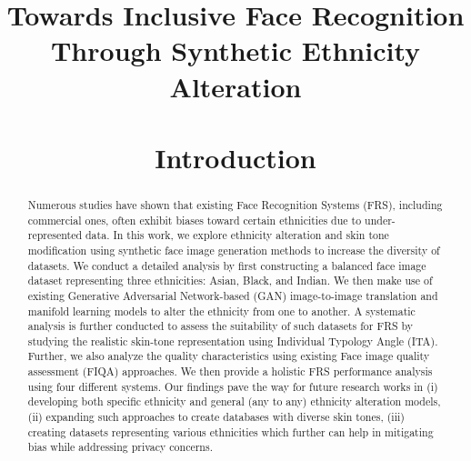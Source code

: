 
\title{\textbf{Towards Inclusive Face Recognition Through Synthetic Ethnicity Alteration}
\maketitle

\thispagestyle{fancy}
\renewcommand{\headrulewidth}{0pt}
\fancyhf{}








\begin{abstract}
Numerous studies have shown that existing Face Recognition Systems (FRS), including commercial ones, often exhibit biases toward certain ethnicities due to under-represented data. In this work, we explore ethnicity alteration and skin tone modification using synthetic face image generation methods to increase the diversity of datasets. We conduct a detailed analysis by first constructing a balanced face image dataset representing three ethnicities: Asian, Black, and Indian. We then make use of existing Generative Adversarial Network-based (GAN) image-to-image translation and manifold learning models to alter the ethnicity from one to another. A systematic analysis is further conducted to assess the suitability of such datasets for FRS by studying the realistic skin-tone representation using Individual Typology Angle (ITA). Further, we also analyze the quality characteristics using existing Face image quality assessment (FIQA) approaches. We then provide a holistic FRS performance analysis using four different systems.  
Our findings pave the way for future research works in (i) developing both specific ethnicity and general (any to any) ethnicity alteration models, (ii) expanding such approaches to create databases with diverse skin tones, (iii) creating datasets representing various ethnicities which further can help in mitigating bias while addressing privacy concerns.



\end{abstract}


\section{Introduction}\label{sec:introduction}

}
